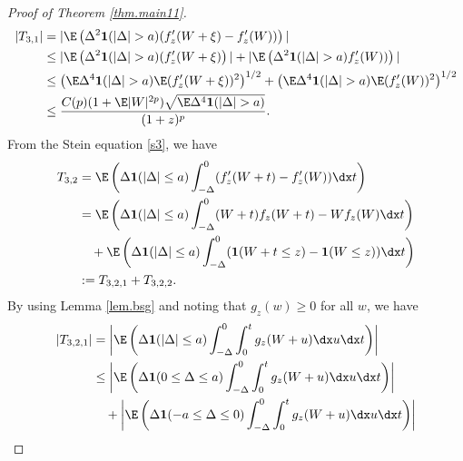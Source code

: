 \begin{proof}[Proof of Theorem \ref{thm.main11}]
	\begin{equation}\label{b031} 
		\begin{aligned}
			|T_{3,1}| &= |\E\left(\Delta^2 \mathbf{1}(|\Delta|>a)(f_{z}'(W+\xi)- f_{z}'(W))\right)| \\
			&\le |\E\left(\Delta^2 \mathbf{1}(|\Delta|>a)(f_{z}'(W+\xi)\right)| + |\E\left(\Delta^2 \mathbf{1}(|\Delta|>a) f_{z}'(W))\right)|  \\	
			&\le \left(\E\Delta^4 \mathbf{1}(|\Delta|>a)\E(f_{z}'(W+\xi))^2\right)^{1/2} 
	     		+\left(\E\Delta^4 \mathbf{1}(|\Delta|>a)\E(f_{z}'(W))^2\right)^{1/2} \\
	     	&\le \dfrac{C(p)(1+\E|W|^{2p})\sqrt{\E\Delta^4 \mathbf{1}(|\Delta|>a)}}{(1+z)^p}.
		\end{aligned} 
	\end{equation}
From the Stein equation \eqref{s3}, we have
	\begin{equation}\label{b032}
		\begin{aligned}
			T_{3,2} &=  \E\left(\Delta \mathbf{1}(|\Delta| \le a)\int_{-\Delta}^{0}(f_{z}'(W+t) - f_{z}'(W))\dx t \right)   \\
			&=  \E\left( \Delta \mathbf{1}(|\Delta| \le a)\int_{-\Delta}^{0}(W+t)f_{z}(W+t) - Wf_{z}(W)\dx t \right)   \\
			& \quad +\E\left( \Delta \mathbf{1}(|\Delta| \le a)\int_{-\Delta}^{0}(\mathbf{1}(W+t \le z) - \mathbf{1}(W \le z))\dx t\right)  \\
			&:= T_{3,2,1} + T_{3,2,2}.
		\end{aligned} 
	\end{equation}
	By using Lemma \ref{lem.bsg} and noting that $g_z(w)\ge 0$ for all $w$, we have
	\begin{equation} \label{b0321}
		\begin{aligned}
			|T_{3,2,1}| &= \left|\E\left( \Delta \mathbf{1}(|\Delta| \le a)\int_{-\Delta}^{0} \int_{0}^{t}g_{z}(W+u)\dx u \dx t \right)\right|  \\
			&\le  \left|\E\left( \Delta \mathbf{1}(0 \le \Delta \le a)\int_{-\Delta}^{0}\int_{0}^{t}g_{z}(W+u)\dx u \dx t \right)\right|\\ 
			&\quad+ \left|\E\left( \Delta \mathbf{1}(-a \le \Delta \le 0)\int_{-\Delta}^{0}\int_{0}^{t}g_{z}(W+u)\dx u \dx t \right)\right|\\

\end{aligned}
\end{equation}
\end{proof}
